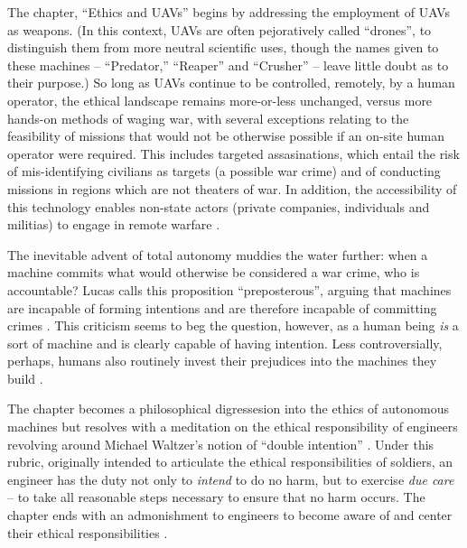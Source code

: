 \documentclass[10pt]{article}
\begin{document}
The chapter, ``Ethics and UAVs'' \cite{Valavanis2015bz} begins by addressing the employment of UAVs as weapons. (In this context, UAVs are often pejoratively called ``drones'', to distinguish them from more neutral scientific uses, though the names given to these machines -- ``Predator,'' ``Reaper'' and ``Crusher'' \cite{Lucas2011} -- leave little doubt as to their purpose.) So long as UAVs continue to be controlled, remotely, by a human operator, the ethical landscape remains more-or-less unchanged, versus more hands-on methods of waging war, with several exceptions relating to the feasibility of missions that would not be otherwise possible if an on-site human operator were required. This includes targeted assasinations, which entail the risk of mis-identifying civilians as targets (a possible war crime) and of conducting missions in regions which are not theaters of war. In addition, the accessibility of this technology enables non-state actors (private companies, individuals and militias) to engage in remote warfare \cite[p.2867]{Valavanis2015bz}. 

The inevitable advent of total autonomy muddies the water further: when a machine commits what would otherwise be considered a war crime, who is accountable? Lucas calls this proposition ``preposterous'', arguing that machines are incapable of forming intentions and are therefore incapable of committing crimes \cite[p.2868]{Valavanis2015bz}. This criticism seems to beg the question, however, as a human being \emph{is} a sort of machine and is clearly capable of having intention. Less controversially, perhaps, humans also routinely invest their prejudices into the machines they build \cite{Greenwald1998,Caliskan2017}. 

The chapter becomes a philosophical digressesion into the ethics of autonomous machines but resolves with a meditation on the ethical responsibility of engineers \cite[p.2873]{Valavanis2015bz} revolving around Michael Waltzer's notion of ``double intention'' \cite{Waltzer}. Under this rubric, originally intended to articulate the ethical responsibilities of soldiers, an engineer has the duty not only to \emph{intend} to do no harm, but to exercise \emph{due care} \cite{Lucas2011} -- to take all reasonable steps necessary to ensure that no harm occurs. The chapter ends with an admonishment to engineers to become aware of and center their ethical responsibilities \cite[p.2974]{Valavanis2015bz}.


\newpage


\end{document}
